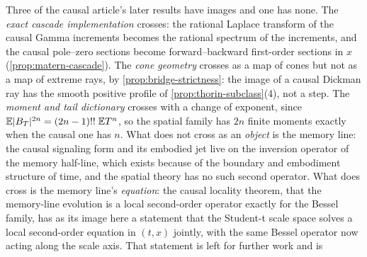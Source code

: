 \begin{remark}\label{rem:bridge-crossings}
Three of the causal article's later results have images and one has none. The \emph{exact
cascade implementation} crosses: the rational Laplace transform of the causal Gamma increments
becomes the rational spectrum of the \Matern{} increments, and the causal pole--zero sections
become forward--backward first-order sections in $x$ (\ref{prop:matern-cascade}). The \emph{cone
geometry} crosses as a map of cones but not as a map of extreme rays, by
\ref{prop:bridge-strictness}: the image of a causal Dickman ray has the smooth positive profile
of \ref{prop:thorin-subclass}(4), not a step. The \emph{moment and tail dictionary} crosses with
a change of exponent, since $\mathbb{E}|B_T|^{2n} = (2n-1)!!\;\mathbb{E}T^n$, so the spatial
family has $2n$ finite moments exactly when the causal one has $n$. What does not cross as an
\emph{object} is the memory line: the causal signaling form and its embodied jet live on the
inversion operator of the memory half-line, which exists because of the boundary and embodiment
structure of time, and the spatial theory has no such second operator. %
What does cross is the
memory line's \emph{equation}: the causal locality theorem, that the memory-line evolution is a
local second-order operator exactly for the Bessel family, has as its image here a statement that
the Student-t scale space solves a local second-order equation in $(t,x)$ jointly, with the same
Bessel operator now acting along the scale axis. That statement is left for further work and is

\end{remark}
